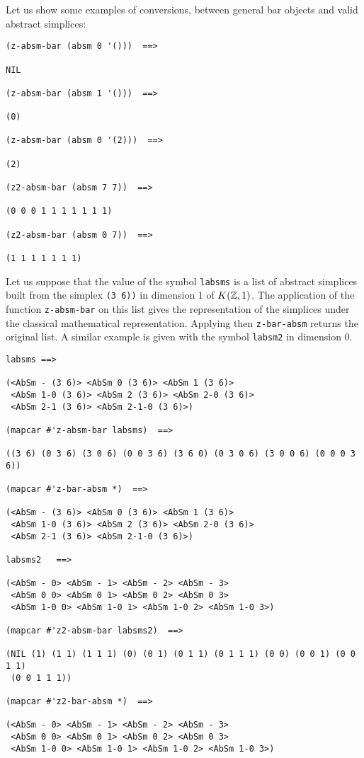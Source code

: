 Let us show some examples of conversions, between general bar objects and valid abstract simplices:
{\footnotesize\begin{verbatim}
(z-absm-bar (absm 0 '()))  ==>

NIL

(z-absm-bar (absm 1 '()))  ==>

(0)

(z-absm-bar (absm 0 '(2)))  ==>

(2)

(z2-absm-bar (absm 7 7))  ==>

(0 0 0 1 1 1 1 1 1 1)

(z2-absm-bar (absm 0 7))  ==>

(1 1 1 1 1 1 1)
\end{verbatim}}
Let us suppose that the value of the symbol {\tt labsms} is a list of
abstract simplices built from the simplex {\tt (3 6))} in dimension $1$ of $K({\mathbb{Z}}, 1)$.
The application of the function {\tt z-absm-bar} on this list gives the representation
of the simplices under the classical mathematical representation. Applying then {\tt z-bar-absm}
returns the original list. A similar example is given with the symbol {\tt labsm2} in dimension $0$.
{\footnotesize\begin{verbatim}
labsms ==>

(<AbSm - (3 6)> <AbSm 0 (3 6)> <AbSm 1 (3 6)>
 <AbSm 1-0 (3 6)> <AbSm 2 (3 6)> <AbSm 2-0 (3 6)>
 <AbSm 2-1 (3 6)> <AbSm 2-1-0 (3 6)>)

(mapcar #'z-absm-bar labsms)  ==>

((3 6) (0 3 6) (3 0 6) (0 0 3 6) (3 6 0) (0 3 0 6) (3 0 0 6) (0 0 0 3 6))

(mapcar #'z-bar-absm *)  ==>

(<AbSm - (3 6)> <AbSm 0 (3 6)> <AbSm 1 (3 6)>
 <AbSm 1-0 (3 6)> <AbSm 2 (3 6)> <AbSm 2-0 (3 6)>
 <AbSm 2-1 (3 6)> <AbSm 2-1-0 (3 6)>)

labsms2   ==>

(<AbSm - 0> <AbSm - 1> <AbSm - 2> <AbSm - 3>
 <AbSm 0 0> <AbSm 0 1> <AbSm 0 2> <AbSm 0 3>
 <AbSm 1-0 0> <AbSm 1-0 1> <AbSm 1-0 2> <AbSm 1-0 3>)

(mapcar #'z2-absm-bar labsms2)  ==>

(NIL (1) (1 1) (1 1 1) (0) (0 1) (0 1 1) (0 1 1 1) (0 0) (0 0 1) (0 0 1 1)
 (0 0 1 1 1))

(mapcar #'z2-bar-absm *)  ==>

(<AbSm - 0> <AbSm - 1> <AbSm - 2> <AbSm - 3>
 <AbSm 0 0> <AbSm 0 1> <AbSm 0 2> <AbSm 0 3>
 <AbSm 1-0 0> <AbSm 1-0 1> <AbSm 1-0 2> <AbSm 1-0 3>)
\end{verbatim}}
\newpage

